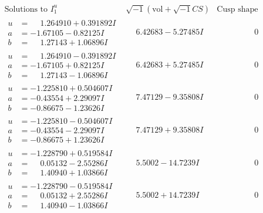 \documentclass[1p]{elsarticle_modified}
\theoremstyle{definition}
\newcommand{\I}{\sqrt{-1}}
\begin{document}
$$\begin{array}{c|c|c}
 \end{array}$$\newpage$$\begin{array}{c|c|c}  
\text{Solutions to }I^u_{1}& \I (\text{vol} + \sqrt{-1}CS) & \text{Cusp shape}\\
 \hline 
\begin{aligned}
u &= \phantom{-}1.264910 + 0.391892 I \\
a &= -1.67105 - 0.82125 I \\
b &= \phantom{-}1.27143 + 1.06896 I\end{aligned}
 & \phantom{-}6.42683 - 5.27485 I & \phantom{-0.000000 } 0 \\ \hline\begin{aligned}
u &= \phantom{-}1.264910 - 0.391892 I \\
a &= -1.67105 + 0.82125 I \\
b &= \phantom{-}1.27143 - 1.06896 I\end{aligned}
 & \phantom{-}6.42683 + 5.27485 I & \phantom{-0.000000 } 0 \\ \hline\begin{aligned}
u &= -1.225810 + 0.504607 I \\
a &= -0.43554 + 2.29097 I \\
b &= -0.86675 - 1.23626 I\end{aligned}
 & \phantom{-}7.47129 - 9.35808 I & \phantom{-0.000000 } 0 \\ \hline\begin{aligned}
u &= -1.225810 - 0.504607 I \\
a &= -0.43554 - 2.29097 I \\
b &= -0.86675 + 1.23626 I\end{aligned}
 & \phantom{-}7.47129 + 9.35808 I & \phantom{-0.000000 } 0 \\ \hline\begin{aligned}
u &= -1.228790 + 0.519584 I \\
a &= \phantom{-}0.05132 - 2.55286 I \\
b &= \phantom{-}1.40940 + 1.03866 I\end{aligned}
 & \phantom{-}5.5002 - 14.7239 I & \phantom{-0.000000 } 0 \\ \hline\begin{aligned}
u &= -1.228790 - 0.519584 I \\
a &= \phantom{-}0.05132 + 2.55286 I \\
b &= \phantom{-}1.40940 - 1.03866 I\end{aligned}
 & \phantom{-}5.5002 + 14.7239 I & \phantom{-0.000000 } 0 \\ \hline\begin{aligned}

\end{aligned}
\end{array}$$
\end{document}
